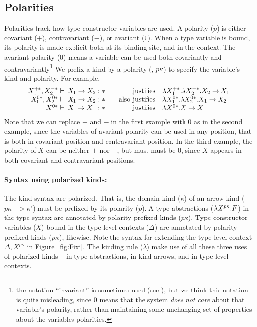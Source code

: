 \subsection{Polarities} \label{ssec:fixi:def:polarity}
Polarities track how type constructor variables are used.
A polarity ($p$) is either covariant ($+$), contravariant ($-$), or
avariant ($0$). When a type variable is bound, its polarity is 
made explicit both at its binding site, and in the context.
The avariant polarity ($0$) means a variable can be used both
covariantly and contravariantly\footnote{the notation ``invariant'' is sometimes used
	(see \cite{AbeMat04}), but we think this notation is quite misleading,
	since $0$ means that the system \emph{does not care} about that
	variable's polarity,
	rather than maintaining some unchanging set of properties about the variables polarities.}
We prefix a kind  by a polarity (\ie, $p\kappa$) to specify the variable's
kind and polarity. For example,
\[
\begin{array}{rlrl}
X_1^{+*},X_2^{-*} |- \!\!\! & X_1 -> X_2 : *
	& ~~~\text{justifies} & \l X_1^{+*}.\l X_2^{-*}.X_2 -> X_1 \\
X_1^{0*},X_2^{0*} |- \!\!\! & X_1 -> X_2 : *
	& ~~~\text{also justifies} & \l X_1^{0*}.\l X_2^{0*}.X_1 -> X_2 \\
X^{0*} |- \!\!\! & X\phantom{_.} -> X\phantom{_2} : *
	& ~~~\text{justifies} & \l X^{0*}.X -> X
\end{array}
\]
Note that we can replace $+$ and $-$ in the first example with $0$
as in the second example, since the variables of avariant polarity can be used
in any position, that is both in covariant position and contravariant position.
In the third example, the polarity of $X$ can be neither $+$ nor $-$, but must
must be $0$, since $X$ appears in both covariant and contravariant positions.

\paragraph{Syntax using polarized kinds:}
The kind syntax are polarized. That is, the domain kind ($\kappa$) of
an arrow kind ($p\kappa -> \kappa'$) must be prefixed by its polarity ($p$).
A type abstractions ($\lambda X^{p\kappa}.F$) in the type syntax are annotated by
polarity-prefixed kinds ($p\kappa$). Type constructor variables ($X$) bound
in the type-level contexts ($\Delta$) are annotated by polarity-prefixed kinds
($p\kappa$), likewise. Note the syntax for extending the type-level context
$\Delta,X^{p\kappa}$ in Figure~\ref{fig:Fixi}. The kinding rule ($\lambda$)
make use of all these three uses of polarized kinds -- in type abstractions,
in kind arrows, and in type-level contexts.

